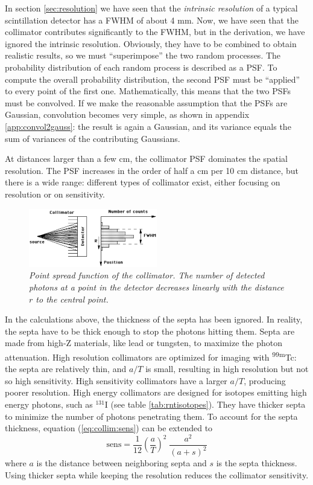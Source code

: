 \documentclass[11pt,oneside]{article}
\begin{document}
In section \ref{sec:resolution} we have seen that the {\em intrinsic
resolution} of a typical scintillation detector has a FWHM of about 4 mm. Now,
we have seen that the collimator contributes significantly to the FWHM, but in
the derivation, we have ignored the intrinsic resolution.  Obviously, they
have to be combined to obtain realistic results, so we must ``superimpose'' the
two random processes. The probability distribution of each random process is
described as a PSF. To compute the overall probability distribution, the
second PSF must be ``applied'' to every point of the first
one. Mathematically, this means that the two PSFs must be convolved. If we
make the reasonable assumption that the PSFs are Gaussian, convolution
becomes very simple, as shown in appendix \ref{app:convol2gauss}: the result
is again a Gaussian, and its variance equals the sum of variances of the
contributing Gaussians.

At distances larger than a few cm, the collimator PSF dominates the spatial
resolution. The PSF increases in the order of half a cm per 10 cm distance,
but there is a wide range: different types of collimator exist, either
focusing on resolution or on sensitivity.

%
\begin{figure}[tb]
\centering
\includegraphics[width=0.5\textwidth]{figs/fig_collimatorpsf.pdf}
\caption{\label{fig:collimatorpsf} \emph{Point spread function of
          the collimator. The number of detected photons at a point in the
          detector decreases linearly with the distance $r$ to the central
          point.}}
\end{figure}

In the calculations above, the thickness of the septa has been
ignored. In reality, the septa have to be thick enough to stop the
photons hitting them. Septa are made from high-Z materials, like lead
or tungsten, to maximize the photon attenuation. High resolution
collimators are optimized for imaging with \textsuperscript{99m}Tc: the septa are
relatively thin, and $a/T$ is small, resulting in high resolution but
not so high sensitivity. High sensitivity collimators have a larger
$a/T$, producing poorer resolution. High energy collimators are
designed for isotopes emitting high energy photons, such as $^{131}$I
(see table \ref{tab:rntisotopes}). They have thicker septa to
minimize the number of photons penetrating them. To account for
the septa thickness, equation (\ref{eq:collim:sens}) can be extended
to
\begin{equation}
  \mbox{sens} =  \frac{1}{12} \left( \frac{a}{T} \right)^2
                 \;\frac{a^2}{(a+s)^2}
\end{equation}
where $a$ is the distance between neighboring septa and $s$ is the septa
thickness. Using thicker septa while keeping the resolution reduces
the collimator sensitivity.
\end{document}
